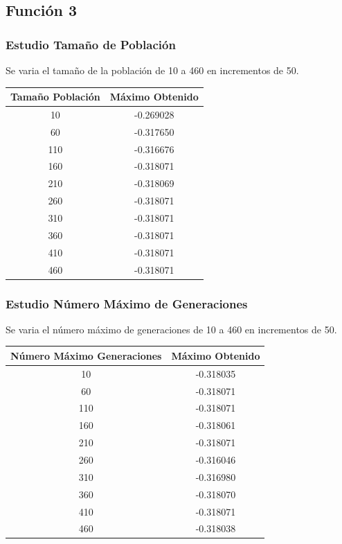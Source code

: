 \documentclass[12pt]{article}
\begin{document}
\subsection{Función 3}
\subsubsection*{Estudio Tamaño de Población}
	Se varia el tamaño de la población de 10 a 460 en incrementos de 50.
\begin{table}[H]
\begin{center}
\begin{tabular}{|cc|} \hline
Tamaño Población & Máximo Obtenido \\  \hline
10  & -0.269028 \\ 
60  & -0.317650 \\ 
110 & -0.316676 \\
160 & -0.318071 \\
210 & -0.318069 \\
260 & -0.318071 \\
310 & -0.318071 \\
360 & -0.318071 \\ 
410 & -0.318071 \\
460 & -0.318071 \\  \hline
\end{tabular}
\end{center}
\end{table}
 

\subsubsection*{Estudio Número Máximo de Generaciones}
	Se varia el número máximo de generaciones de 10 a 460 en incrementos de 50.
\begin{table}[H]
\begin{center}
\begin{tabular}{|cc|} \hline
Número Máximo Generaciones & Máximo Obtenido \\  \hline
10  & -0.318035 \\ 
60  & -0.318071 \\ 
110 & -0.318071 \\
160 & -0.318061 \\
210 & -0.318071 \\
260 & -0.316046 \\
310 & -0.316980 \\
360 & -0.318070 \\ 
410 & -0.318071 \\
460 & -0.318038 \\  \hline
\end{tabular}
\end{center}
\end{table}
\end{document}
